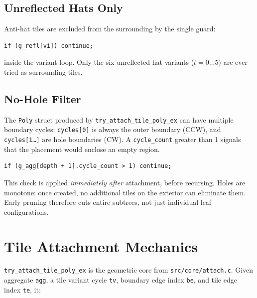 \documentclass[10pt,a4paper]{article}
\let\polysection\section
\renewcommand\section{\needspace{0.16\textheight}\polysection}
\let\polysubsection\subsection
\renewcommand\subsection{\needspace{0.12\textheight}\polysubsection}
\newcommand{\code}[1]{\texttt{\small #1}}
\newcommand{\file}[1]{\texttt{\footnotesize #1}}
\begin{document}
\subsection{Unreflected Hats Only}

Anti-hat tiles are excluded from the surrounding by the single guard:
\begin{verbatim}
if (g_refl[vi]) continue;
\end{verbatim}
inside the variant loop.  Only the six unreflected hat variants
($t = 0\ldots 5$) are ever tried as surrounding tiles.

\subsection{No-Hole Filter}

The \code{Poly} struct produced by \code{try\_attach\_tile\_poly\_ex}
can have multiple boundary cycles: \code{cycles[0]} is always the outer
boundary (CCW), and \code{cycles[1\ldots]} are hole boundaries (CW).
A \code{cycle\_count} greater than 1 signals that the placement would
enclose an empty region.

\begin{verbatim}
if (g_agg[depth + 1].cycle_count > 1) continue;
\end{verbatim}

This check is applied \emph{immediately after} attachment, before
recursing.  Holes are monotone: once created, no additional tiles on the
exterior can eliminate them.  Early pruning therefore cuts entire
subtrees, not just individual leaf configurations.

\section{Tile Attachment Mechanics}

\code{try\_attach\_tile\_poly\_ex} is the geometric core from
\file{src/core/attach.c}.  Given aggregate \code{agg}, a tile variant
cycle \code{tv}, boundary edge index \code{be}, and tile edge index
\code{te}, it:
\end{document}
